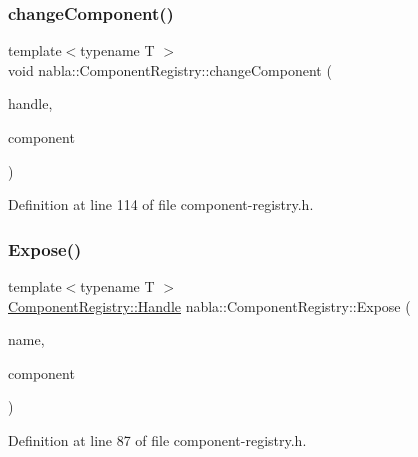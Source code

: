 \subsubsection{\texorpdfstring{changeComponent()}{changeComponent()}}
{\footnotesize\ttfamily template$<$typename T $>$ \\
void nabla\+::\+Component\+Registry\+::change\+Component (\begin{DoxyParamCaption}\item[{\mbox{\hyperlink{structnabla_1_1_component_registry_1_1_handle}{Handle}}}]{handle,  }\item[{\mbox{\hyperlink{structnabla_1_1_sharable_component}{Sharable\+Component}}$<$ T $>$ $\ast$}]{component }\end{DoxyParamCaption})}



Definition at line 114 of file component-\/registry.\+h.

\mbox{\label{classnabla_1_1_component_registry_a776156940c82f102cbcfc7e0fbd2030b}} 
\subsubsection{\texorpdfstring{Expose()}{Expose()}}
{\footnotesize\ttfamily template$<$typename T $>$ \\
\mbox{\hyperlink{structnabla_1_1_component_registry_1_1_handle}{Component\+Registry\+::\+Handle}} nabla\+::\+Component\+Registry\+::\+Expose (\begin{DoxyParamCaption}\item[{const char $\ast$}]{name,  }\item[{\mbox{\hyperlink{structnabla_1_1_sharable_component}{Sharable\+Component}}$<$ T $>$ $\ast$}]{component }\end{DoxyParamCaption})\hspace{0.3cm}{\ttfamily [inline]}}



Definition at line 87 of file component-\/registry.\+h.

\mbox{\label{classnabla_1_1_component_registry_ad3bcf27ad62f7628ac2e69affab26a9e}} 
